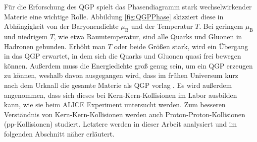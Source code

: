 \newline
Für die Erforschung des QGP spielt das Phasendiagramm stark wechselwirkender Materie eine wichtige Rolle.
Abbildung \ref{fig:QGPPhase} skizziert diese in Abhängigkeit von der Baryonendichte $\mu_{\text{B}}$ und der Temperatur $T$.
Bei geringem $\mu_{\text{B}}$ und niedrigem $T$, wie etwa Raumtemperatur, sind alle Quarks und Gluonen in Hadronen gebunden.
Erhöht man $T$ oder beide Größen stark, wird ein Übergang in das QGP erwartet, in dem sich die Quarks und Gluonen quasi frei bewegen können.
Außerdem muss die Energiedichte groß genug sein, um ein QGP erzeugen zu können, weshalb davon ausgegangen wird, dass im frühen Universum kurz nach dem Urknall die gesamte Materie als QGP vorlag \cite{Kapusta:2000fe}. 
Es wird außerdem angenommen, dass sich dieses bei Kern-Kern-Kollisionen im Labor ausbilden kann, wie sie beim ALICE Experiment untersucht werden.
\newline
Zum besseren Verständnis von Kern-Kern-Kollisionen werden auch Proton-Proton-Kollisionen (pp-Kollisionen) studiert.
Letztere werden in dieser Arbeit analysiert und im folgenden Abschnitt näher erläutert.